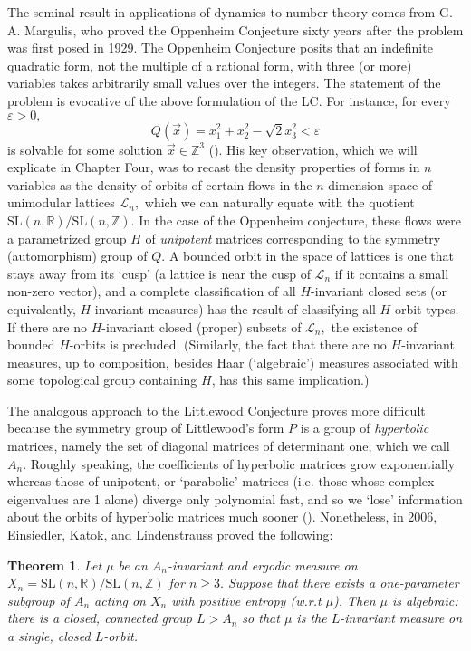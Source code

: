 \documentclass[12pt, letterpaper, oneside]{book}
\renewcommand{\ge}{\ensuremath{\varepsilon}}
\newcommand{\R}{\mathbb{R}}
\newcommand{\Z}{\mathbb{Z}}
\theoremstyle{plain}
\newtheorem{theorem}{Theorem}
\theoremstyle{definition}
\theoremstyle{remark}
\begin{document}
The seminal result in  applications of dynamics to number theory comes from G. A. Margulis, who proved the Oppenheim Conjecture sixty years after the problem was first posed in 1929. The Oppenheim Conjecture posits that an indefinite quadratic form, not the multiple of a rational form, with three (or more) variables takes arbitrarily small values over the integers. The statement of the problem is evocative of the above formulation of the LC. For instance, for every $\ge > 0,$ 
\[
Q(\vec{x}) = x_1^2 + x_2^2 - \sqrt{2} x_3^2 < \ge
\]
is solvable for some solution $\vec{x} \in \Z^3$ (\cite{Ven08}). His key observation, which we will explicate in Chapter Four, was to recast the density properties of forms in $n$ variables as the density of orbits of certain flows in the $n$-dimension space of unimodular lattices $\mathcal{L}_n,$ which we can naturally equate with the quotient $\mbox{SL}(n,\R)/\mbox{SL}(n, \Z).$ In the case of the Oppenheim conjecture, these flows were a parametrized group $H$ of \textit{unipotent} matrices corresponding to the symmetry (automorphism) group of $Q.$ A bounded orbit in the space of lattices is one that stays away from its `cusp' (a lattice is near the cusp of $\mathcal{L}_n$ if it contains a small non-zero vector), and a complete classification of all $H$-invariant closed sets (or equivalently, $H$-invariant measures) has the result of classifying all $H$-orbit types. If there are no $H$-invariant closed (proper) subsets of $\mathcal{L}_n,$ the existence of bounded $H$-orbits is precluded. (Similarly, the fact that there are no $H$-invariant measures, up to composition, besides Haar (`algebraic') measures associated with some topological group containing $H$, has this same implication.)

The analogous approach to the Littlewood Conjecture proves more difficult because the symmetry group of Littlewood's form $P$ is a group of \textit{hyperbolic} matrices, namely the set of diagonal matrices of determinant one, which we call $A_n.$ Roughly speaking, the coefficients of hyperbolic matrices grow exponentially whereas those of unipotent, or `parabolic' matrices (i.e. those whose complex eigenvalues are 1 alone) diverge only polynomial fast, and so we `lose' information about the orbits of hyperbolic matrices much sooner (\cite{Ven08}). Nonetheless, in 2006, Einsiedler, Katok, and Lindenstrauss proved the following:

\begin{theorem}
Let $\mu$ be an $A_n$-invariant and ergodic measure on $X_n = \mbox{SL}(n,\R)/\mbox{SL}(n, \Z)$ for $n \geq 3.$ Suppose that there exists a one-parameter subgroup of $A_n$ acting on $X_n$ with positive entropy (w.r.t $\mu$). Then $\mu$ is algebraic: there is a closed, connected group $L > A_n$ so that $\mu$ is the $L$-invariant measure on a single, closed $L$-orbit. 
\end{theorem}
\end{document}
